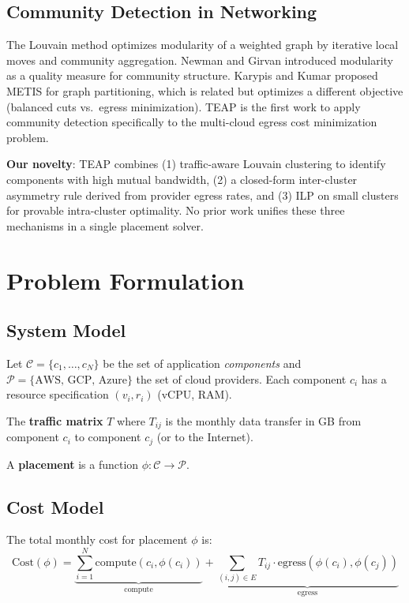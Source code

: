 \documentclass[10pt,journal,compsoc]{IEEEtran}
\begin{document}
\subsection{Community Detection in Networking}
The Louvain method \cite{blondel2008} optimizes modularity of a weighted
graph by iterative local moves and community aggregation.
Newman and Girvan \cite{newman2004} introduced modularity as a quality measure
for community structure.
Karypis and Kumar \cite{karypis1998} proposed METIS for graph partitioning,
which is related but optimizes a different objective (balanced cuts vs.\ egress
minimization).
TEAP is the first work to apply community detection specifically to the
multi-cloud egress cost minimization problem.

\textbf{Our novelty}: TEAP combines (1) traffic-aware Louvain clustering to
identify components with high mutual bandwidth, (2) a closed-form
inter-cluster asymmetry rule derived from provider egress rates, and (3) ILP
on small clusters for provable intra-cluster optimality.
No prior work unifies these three mechanisms in a single placement solver.

\section{Problem Formulation}
\label{sec:problem}

\subsection{System Model}

Let $\mathcal{C} = \{c_1, \ldots, c_N\}$ be the set of application
\emph{components} and $\mathcal{P} = \{\text{AWS, GCP, Azure}\}$ the set of
cloud providers.
Each component $c_i$ has a resource specification $(v_i, r_i)$ (vCPU, RAM).

The \textbf{traffic matrix} $T$ where $T_{ij}$ is the monthly data transfer
in GB from component $c_i$ to component $c_j$ (or to the Internet).

A \textbf{placement} is a function $\phi: \mathcal{C} \to \mathcal{P}$.

\subsection{Cost Model}

The total monthly cost for placement $\phi$ is:
\begin{equation}
\label{eq:total_cost}
\text{Cost}(\phi) = \underbrace{\sum_{i=1}^{N} \text{compute}(c_i, \phi(c_i))}_{\text{compute}} +
                   \underbrace{\sum_{(i,j) \in E} T_{ij} \cdot \text{egress}(\phi(c_i), \phi(c_j))}_{\text{egress}}
\end{equation}
\end{document}
